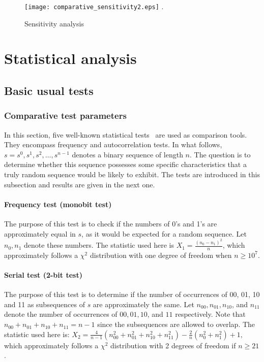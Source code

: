 \documentclass[10pt, a4paper, conference, compsocconf]{IEEEtran}
\begin{document}
\begin{figure}
\centering
\texttt{[image: comparative\_sensitivity2.eps]}
\DeclareGraphicsExtensions.
\caption{Sensitivity analysis}
\label{Sensitivity analysis}
\end{figure}

\section{Statistical analysis}
\label{Comparative analysis}
\subsection{Basic usual tests}


\subsubsection{Comparative test parameters}
In this section, five well-known statistical tests~\cite{Menezes1997} are used as  comparison tools. They encompass frequency and autocorrelation tests. In what follows, $s = s^0,s^1,s^2,\dots , s^{n-1}$ denotes a binary sequence of length $n$. The question is to determine whether this sequence possesses some specific characteristics that a truly random sequence would be likely to exhibit. The tests are introduced in this subsection and results are given in the next one.

\paragraph{Frequency test (monobit test)}
The purpose of this test is to check if the numbers of 0's and 1's are approximately equal in $s$, as it would be expected for a random sequence. Let $n_0, n_1$ denote these numbers. The statistic used here is $X_1=\frac{(n_0-n_1)^2}{n}$, which approximately follows a $\chi^2$ distribution with one degree of freedom when $n\geqslant 10^7$.

\paragraph{Serial test (2-bit test)}
The purpose of this test is to determine if the number of occurrences of 00, 01, 10 and 11 as subsequences of $s$ are approximately the same. Let $n_{00} , n_{01} ,n_{10}$, and $n_{11}$ denote the number of occurrences of $00, 01, 10$, and $11$ respectively. Note that $n_{00} + n_{01} + n_{10} + n_{11} = n-1$ since the subsequences are allowed to overlap. The
statistic used here is:\newline
$X_2=\frac{4}{n-1}(n_{00}^2+n_{01}^2+n_{10}^2+n_{11}^2)-\frac{2}{n}(n_0^2+n_1^2)+1,$
\noindent which approximately follows a $\chi^2$ distribution with 2 degrees of freedom if $n\geqslant 21$.
\end{document}
